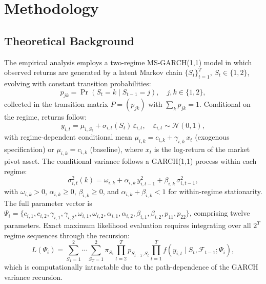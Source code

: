 \documentclass[12pt, a4paper]{article}
\begin{document}
\section{Methodology}
\label{sec:methodology}

\subsection{Theoretical Background}

The empirical analysis employs a two-regime MS-GARCH(1,1) model in which observed returns are generated by a latent Markov chain $\{S_t\}_{t=1}^T$, $S_t \in \{1, 2\}$, evolving with constant transition probabilities:
\begin{equation}
p_{jk} = \Pr(S_t = k \mid S_{t-1} = j), \quad j, k \in \{1, 2\},
\end{equation}
collected in the transition matrix $P = (p_{jk})$ with $\sum_k p_{jk} = 1$. Conditional on the regime, returns follow:
\begin{equation}
y_{i,t} = \mu_{i,S_t} + \sigma_{i,t}(S_t)\,\varepsilon_{i,t}, \quad \varepsilon_{i,t} \sim \mathcal{N}(0,1),
\end{equation}
with regime-dependent conditional mean $\mu_{i,k} = c_{i,k} + \gamma_{i,k}\,x_t$ (exogenous specification) or $\mu_{i,k} = c_{i,k}$ (baseline), where $x_t$ is the log-return of the market pivot asset. The conditional variance follows a GARCH(1,1) process within each regime:
\begin{equation}
\sigma_{i,t}^2(k) = \omega_{i,k} + \alpha_{i,k}\,y_{i,t-1}^2 + \beta_{i,k}\,\sigma_{i,t-1}^2,
\end{equation}
with $\omega_{i,k} > 0$, $\alpha_{i,k} \ge 0$, $\beta_{i,k} \ge 0$, and $\alpha_{i,k} + \beta_{i,k} < 1$ for within-regime stationarity. The full parameter vector is $\Psi_i = \{c_{i,1}, c_{i,2}, \gamma_{i,1}, \gamma_{i,2}, \omega_{i,1}, \omega_{i,2}, \alpha_{i,1}, \alpha_{i,2}, \beta_{i,1}, \beta_{i,2}, p_{11}, p_{22}\}$, comprising twelve parameters. Exact maximum likelihood evaluation requires integrating over all $2^T$ regime sequences through the recursion:
\begin{equation}
L(\Psi_i) = \sum_{S_1=1}^{2}\cdots\sum_{S_T=1}^{2} \pi_{S_1}\prod_{t=2}^T p_{S_{t-1},S_t}\prod_{t=1}^T f(y_{i,t}\mid S_t, \mathcal{F}_{t-1};\Psi_i),
\end{equation}
which is computationally intractable due to the path-dependence of the GARCH variance recursion.
\end{document}
